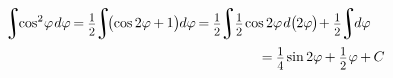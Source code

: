 \documentclass[14pt]{extarticle}
\DeclareMathOperator*{\integral}{\scalerel*{\rotatebox{12}{$\!\textstyle\int\!$}}{\int}} %
\newcommand\cosine{\operatorname{cos}}
\newcommand\sine{\operatorname{sin}}
\begin{document}
\[\begin{multlined}
\integral \hspace{-0.7ex} \cosine^{2} \hspace{-.33ex} \varphi \hspace{.2ex} d\varphi \hspace{-.2ex}
= \hspace{-.1ex} \scalebox{.88}{$ \displaystyle\frac{\raisebox{-.2em}{$1$}}{2} $} \hspace{-.5ex}
\integral \hspace{-0.55ex} \bigl( \cosine 2\varphi \hspace{-.1ex} + \hspace{-.1ex} 1 \bigr) \hspace{-.1ex} d\varphi \hspace{-.2ex}
= \hspace{-.1ex} \scalebox{.88}{$ \displaystyle\frac{\raisebox{-.2em}{$1$}}{2} $} \hspace{-.5ex}
\integral \hspace{-0.6ex} \scalebox{.88}{$ \displaystyle\frac{\raisebox{-.2em}{$1$}}{2} $}
\hspace{-.15ex} \cosine 2\varphi \hspace{.2ex} d\bigl(\hspace{-.1ex} 2\varphi \hspace{-.1ex}\bigr) \hspace{-.4ex}
+ \scalebox{.88}{$ \displaystyle\frac{\raisebox{-.2em}{$1$}}{2} $} \hspace{-.5ex}
\integral \hspace{-0.7ex} d\varphi
\\[.2em]
%
= \hspace{-.1ex} \scalebox{.88}{$ \displaystyle\frac{\raisebox{-.2em}{$1$}}{4} $} \hspace{-.1ex} \sine 2\varphi \hspace{-.1ex}
+ \scalebox{.88}{$ \displaystyle\frac{\raisebox{-.2em}{$1$}}{2} $} \hspace{.15ex} \varphi \hspace{-.1ex}
+ \hspace{-.1ex} C
\end{multlined}\]
\end{document}
